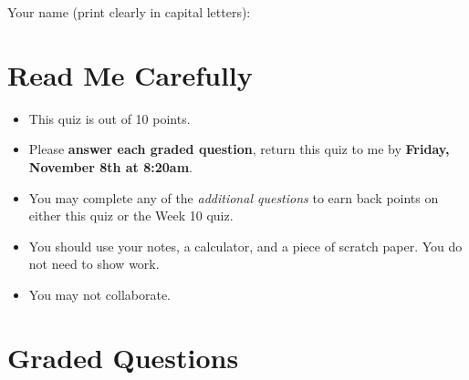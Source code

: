 \documentclass{ccg-topic}
\author{Colton Grainger}
\date{2019-11-08}
\begin{document}
\maketitle

Your name (print clearly in capital letters): \underline{\hspace{8cm}}

\section*{Read Me Carefully}
\begin{itemize}
    \item This quiz is out of 10 points. 
    \item Please \textbf{answer each graded question}, return this quiz to me by \textbf{Friday, November 8th at 8:20am}.
    \item You may complete any of the \emph{additional questions} to earn back points on either this quiz or the Week 10 quiz.
    \item You should use your notes, a calculator, and a piece of scratch paper. You do not need to show work.
    \item You may not collaborate. 
\end{itemize}

\section*{Graded Questions}
\end{document}
